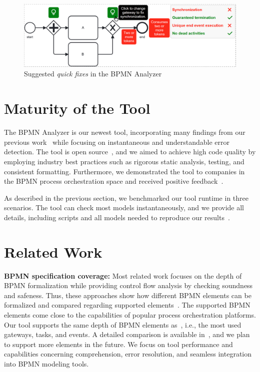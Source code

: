 \documentclass[
onecolumn, %
]{ceurart}
\begin{document}
\begin{figure}[ht]
	\centering
	\includegraphics[width=0.6\linewidth]{images/quick-fix}
	\caption{Suggested \textit{quick fixes} in the BPMN Analyzer}
	\label{fig:quick-fixes}
\end{figure}

\section{Maturity of the Tool} \label{sec:maturity}
The BPMN Analyzer is our newest tool, incorporating many findings from our previous work~\cite{krauterFormalizationAnalysisBPMN2023} while focusing on instantaneous and understandable error detection.
The tool is open source~\cite{krauterInstantaneousComprehensibleFixable2024}, and we aimed to achieve high code quality by employing industry best practices such as rigorous static analysis, testing, and consistent formatting.
Furthermore, we demonstrated the tool to companies in the BPMN process orchestration space and received positive feedback~\cite{krauterInstantaneousComprehensibleFixable2024}.

As described in the previous section, we benchmarked our tool runtime in three scenarios.
The tool can check most models instantaneously, and we provide all details, including scripts and all models needed to reproduce our results~\cite{krauterInstantaneousComprehensibleFixable2024}.

\section{Related Work} \label{sec:related-work}

\textbf{BPMN specification coverage:}
Most related work focuses on the depth of BPMN formalization while providing control flow analysis by checking soundness and safeness.
Thus, these approaches show how different BPMN elements can be formalized and compared regarding supported elements~\cite{krauterHigherorderTransformationApproach2024,krauterFormalizationAnalysisBPMN2023,corradiniFormalApproachAnalysis2021,houhouFirstOrderLogicVerification2022}.
The supported BPMN elements come close to the capabilities of popular process orchestration platforms.
Our tool supports the same depth of BPMN elements as~\cite{corradiniFormalApproachAnalysis2021}, i.e., the most used gateways, tasks, and events.
A detailed comparison is available in~\cite{krauterInstantaneousComprehensibleFixable2024}, and we plan to support more elements in the future.
We focus on tool performance and capabilities concerning comprehension, error resolution, and seamless integration into BPMN modeling tools.
\end{document}
